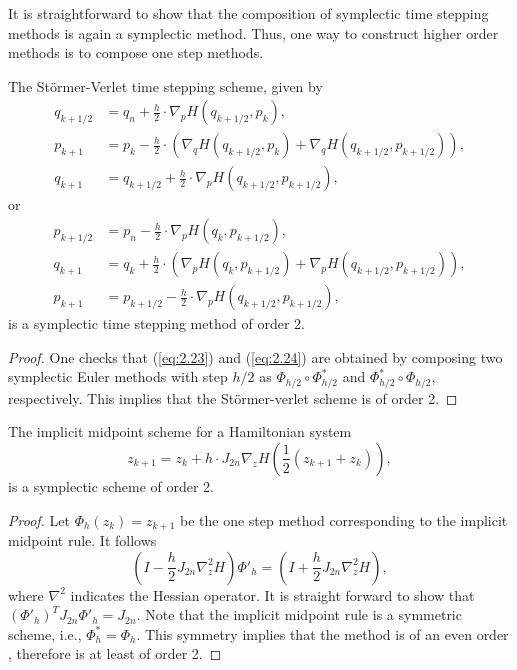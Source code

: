 It is straightforward to show that the composition of symplectic time stepping methods is again a symplectic method. Thus, one way to construct higher order methods is to compose one step methods.
\begin{theorem}
The St\"ormer-Verlet time stepping scheme, given by
\begin{equation} \label{eq:2.23}
\begin{aligned}
	q_{k+1/2} &= q_n + \frac h 2 \cdot \nabla_pH(q_{k+1/2},p_k), \\
	p_{k+1} &= p_k - \frac h 2\cdot (\nabla_qH(q_{k+1/2},p_k) + \nabla_qH(q_{k+1/2},p_{k+1/2}) ), \\
	q_{k+1} &= q_{k+1/2} + \frac h 2 \cdot \nabla_pH(q_{k+1/2},p_{k+1/2}),
\end{aligned}
\end{equation}
or 
\begin{equation} \label{eq:2.24}
\begin{aligned}
	p_{k+1/2} &= p_n - \frac h 2 \cdot \nabla_pH(q_k,p_{k+1/2}), \\
	q_{k+1} &= q_k + \frac h 2\cdot (\nabla_pH(q_k,p_{k+1/2}) + \nabla_pH(q_{k+1/2},p_{k+1/2}) ), \\
	p_{k+1} &= p_{k+1/2} - \frac h 2 \cdot \nabla_pH(q_{k+1/2},p_{k+1/2}),
\end{aligned}
\end{equation}
is a symplectic time stepping method of order 2.
\end{theorem}
\begin{proof}
One checks that (\ref{eq:2.23}) and (\ref{eq:2.24}) are obtained by composing two symplectic Euler methods with step $h/2$ as $\Phi_{h/2}\circ \Phi^*_{h/2}$ and $\Phi^*_{h/2}\circ \Phi_{h/2}$, respectively. This implies that the St\"ormer-verlet scheme is of order 2.
\end{proof}
\begin{theorem}
The implicit midpoint scheme for a Hamiltonian system
\begin{equation}
	z_{k+1} = z_k + h \cdot J_{2n} \nabla_z H( \frac{1}{2}(z_{k+1} + z_k) ),
\end{equation}
is a symplectic scheme of order 2.
\end{theorem}
\begin{proof}
Let $\Phi_h(z_k) = z_{k+1}$ be the one step method corresponding to the implicit midpoint rule. It follows 
\begin{equation*}
	(I - \frac h 2 J_{2n} \nabla^2_z H) \Phi'_h = (I + \frac{h}{2} J_{2n} \nabla^2_z H),
\end{equation*}
where $\nabla^2$ indicates the Hessian operator. It is straight forward to show that $(\Phi'_h)^T J_{2n} \Phi'_h = J_{2n} $. Note that the implicit midpoint rule is a symmetric scheme, i.e., $\Phi^*_h = \Phi_h$. This symmetry implies that the method is of an even order \cite{hairer2006geometric}, therefore is at least of order 2.
\end{proof}

